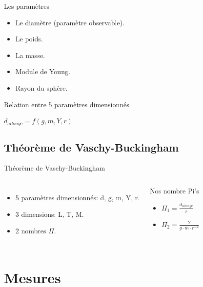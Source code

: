 \documentclass[aspectratio=169,xcolor=dvipsnames]{beamer}
\begin{document}
\begin{frame}{Les paramètres}
    \begin{itemize}
        \item Le diamètre (paramètre observable).
        \item Le poids.
        \item La masse.
        \item Module de Young.
        \item Rayon du sphère.
    \end{itemize}
    \begin{block}{Relation entre 5 paramètres dimensionnés}
        \begin{center}
            \(d_{allongé}=f(g,m,Y,r)\)
        \end{center}
    \end{block}
\end{frame}

\subsection{Théorème de Vaschy-Buckingham}
\begin{frame}{Théorème de Vaschy-Buckingham}
    \begin{columns}
        \begin{itemize}
            \item 5 paramètres dimensionnés: d, g, m, Y, r.
            \item 3 dimensions: L, T, M.
            \item 2 nombres $\Pi$.
        \end{itemize}
        \begin{block}{Nos nombre Pi's}   
            \begin{itemize}
                \item \(\Pi_1 = \frac{d_{allongé}}{r}\)
                \item \(\Pi_2 = \frac{Y}{g\cdot m\cdot r^{-2}}\)
            \end{itemize}
        \end{block}
    \end{columns}
\end{frame}

\section{Mesures}
\end{document}
